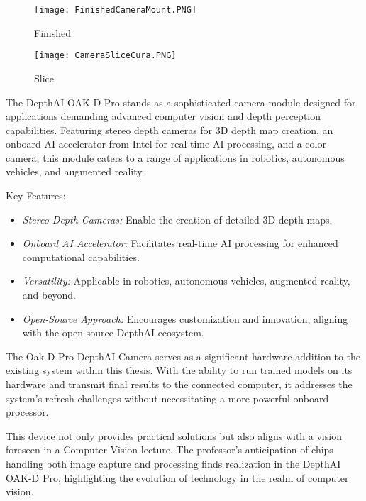 \documentclass{Configuration_Files/PoliMi3i_thesis}
\begin{document}
\begin{figure}[h]
    \centering
    \texttt{[image: FinishedCameraMount.PNG]}
    \caption{Finished}
\end{figure}

\begin{figure}[h]
    \centering
    \texttt{[image: CameraSliceCura.PNG]}
    \caption{Slice}
\end{figure}

The DepthAI OAK-D Pro stands as a sophisticated camera module designed for applications demanding advanced computer vision and depth perception capabilities. Featuring stereo depth cameras for 3D depth map creation, an onboard AI accelerator from Intel for real-time AI processing, and a color camera, this module caters to a range of applications in robotics, autonomous vehicles, and augmented reality.

Key Features:

\begin{itemize}
    \item \textit{Stereo Depth Cameras:} Enable the creation of detailed 3D depth maps.
    \item \textit{Onboard AI Accelerator:} Facilitates real-time AI processing for enhanced computational capabilities.
    \item \textit{Versatility:} Applicable in robotics, autonomous vehicles, augmented reality, and beyond.
    \item \textit{Open-Source Approach:} Encourages customization and innovation, aligning with the open-source DepthAI ecosystem.
\end{itemize}
The Oak-D Pro DepthAI Camera serves as a significant hardware addition to the existing system within this thesis. With the ability to run trained models on its hardware and transmit final results to the connected computer, it addresses the system's refresh challenges without necessitating a more powerful onboard processor.

This device not only provides practical solutions but also aligns with a vision foreseen in a Computer Vision lecture. The professor's anticipation of chips handling both image capture and processing finds realization in the DepthAI OAK-D Pro, highlighting the evolution of technology in the realm of computer vision.
\end{document}
